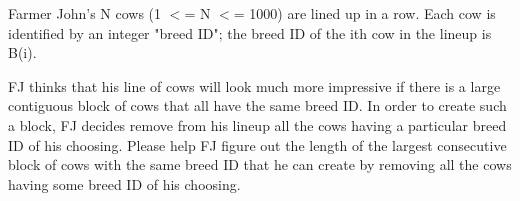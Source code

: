 Farmer John's N cows (1 $<$= N $<$= 1000) are lined up in a row.  Each cow is identified by an integer "breed ID"; the breed ID of the ith cow in the lineup is B(i).

FJ thinks that his line of cows will look much more impressive if there is a large contiguous block of cows that all have the same breed ID.  In order to create such a block, FJ decides remove from his lineup all the cows having a particular breed ID of his choosing.  Please help FJ figure out the length of the largest consecutive block of cows with the same breed ID that he can create by removing all the cows having some breed ID of his choosing.